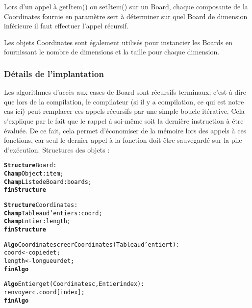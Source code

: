 	Lors d'un appel à getItem() ou setItem() sur un Board, chaque composante de la Coordinates fournie en paramètre sert à déterminer sur quel Board de dimension inférieure il faut effectuer l'appel récursif. \newline

	Les objets Coordinates sont également utilisés pour instancier les Boards en fournissant le nombre de dimensions et la taille pour chaque dimension.

	\subsubsection{Détails de l'implantation}

	Les algorithmes d'accès aux cases de Board sont récursifs terminaux; c'est à dire que lors de la compilation, le compilateur (si il y a compilation, ce qui est notre cas ici) peut remplacer ces appels récursifs par une simple boucle itérative. Cela s'explique par le fait que le rappel à soi-même soit la dernière instruction à être évaluée. De ce fait, cela permet d'économiser de la mémoire lors des appels à ces fonctions, car seul le dernier appel à la fonction doit être sauvegardé sur la pile d'exécution. \newline
	Structures des objets :

\begin{alltt}
{\bf Structure} Board :
    {\bf Champ} Object : item;
    {\bf Champ} Liste de Board : boards;
{\bf fin Structure}

{\bf Structure} Coordinates :
    {\bf Champ} Tableau d'entiers : coord;
    {\bf Champ} Entier : length;
{\bf fin Structure}
\end{alltt}



\begin{alltt}
{\bf Algo} Coordinates creerCoordinates(Tableau d'entier t) :
    coord <- copie de t;
    length <- longueur de t;
{\bf finAlgo}

{\bf Algo} Entier get(Coordinates c, Entier index) :
    renvoyer c.coord[index];
{\bf finAlgo}
\end{alltt}


\newpage
{}


